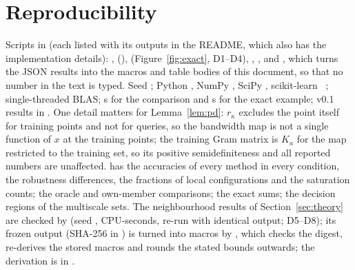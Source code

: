\documentclass[11pt,a4paper]{article}
\theoremstyle{plain}
\theoremstyle{definition}
\theoremstyle{remark}
\begin{document}
\section{Reproducibility}\label{app:repro}
{\sloppy Scripts in  (each listed with its outputs in the README, which also has the implementation details): ,  (),  (Figure~\ref{fig:exact}, D1--D4), , ,  and , which turns the JSON results into the macros and table bodies of this document, so that no number in the text is typed. Seed \MetaSeed; Python \MetaPython, NumPy \MetaNumpy, SciPy \MetaScipy, scikit-learn \MetaSklearn~\citep{pedregosa2011}; single-threaded BLAS; \MetaSecondsMain{} s for the comparison and \MetaSecondsExact{} s for the exact example; v0.1 results in . One detail matters for Lemma~\ref{lem:pd}: $r_\kappa$ excludes the point itself for training points and not for queries, so the bandwidth map is not a single function of $x$ at the training points; the training Gram matrix is $K_a$ for the map restricted to the training set, so its positive semidefiniteness and all reported numbers are unaffected.  has the accuracies of every method in every condition, the robustness differences, the fractions of local configurations and the saturation counts;  the oracle and own-member comparisons;  the exact sums;  the decision regions of the multiscale sets. The neighbourhood results of Section~\ref{sec:theory} are checked by  (seed \KLSeed, \KLCpu{} CPU-seconds, re-run with identical output; D5--D8); its frozen output  (SHA-256 in ) is turned into macros by , which checks the digest, re-derives the stored macros and rounds the stated bounds outwards; the derivation is in .\par}
\end{document}
